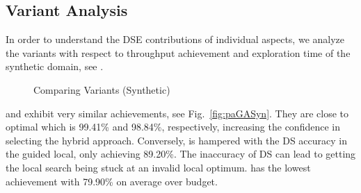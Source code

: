 \subsection{\ga Variant Analysis}
\label{sec:resMutation}

In order to understand the DSE contributions of individual \ga aspects, we analyze the variants with respect to throughput achievement and exploration time of the synthetic domain, see .

\begin{figure}[h]
	\centering
	\hfill
	\caption{Comparing \ga Variants (Synthetic)}
	\label{fig:dse:tr}
\end{figure}




\gah and \gaana exhibit very similar achievements, see Fig.~\ref{fig:paGASyn}. They are close to optimal which is 99.41\% and 98.84\%, respectively, increasing the confidence in selecting the hybrid approach. Conversely, \gads is hampered with the DS accuracy in the guided local, only achieving 89.20\%. The inaccuracy of DS can lead to getting the local search being stuck at an invalid local optimum. \garand has the lowest achievement with 79.90\% on average over budget.

